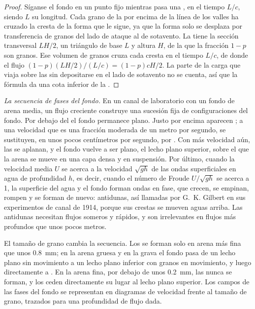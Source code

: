\begin{proof}
Síganse el fondo en un punto fijo mientras pasa una , en el tiempo $L/c$, siendo $L$ su longitud. Cada grano de la  por encima de la línea de los valles
ha cruzado la cresta de la forma que le sigue, ya que la forma solo se desplaza por transferencia de granos del lado de ataque al de sotavento. La  tiene la sección transversal
$LH/2$, un triángulo de base $L$ y altura $H$, de la que la fracción $1 - p$ son granos. Ese volumen de granos cruza cada cresta en el tiempo $L/c$, de donde el flujo
$(1-p)(LH/2)/(L/c) = (1-p)cH/2$. La parte de la carga que viaja sobre las  sin depositarse en el lado de sotavento no se cuenta, así que la fórmula da una cota inferior
de la .
\end{proof}

\emph{La secuencia de fases del fondo.} En un canal de laboratorio con un fondo de arena media, un flujo creciente construye una sucesión fija de configuraciones del fondo.
Por debajo del  el fondo permanece plano. Justo por encima aparecen ; a una velocidad que es una fracción moderada de un metro por segundo,
se sustituyen, en unos pocos centímetros por segundo, por . Con más velocidad aún, las  se aplanan, y el fondo vuelve a ser plano, el lecho plano superior,
sobre el que la arena se mueve en una capa densa y en suspensión. Por último, cuando la velocidad media $U$ se acerca a la velocidad $\sqrt{gh}$ de las ondas
superficiales en agua de profundidad $h$, es decir, cuando el número de Froude $U/\sqrt{gh}$ se acerca a 1, la superficie del agua y el fondo forman ondas en fase,
que crecen, se empinan, rompen y se forman de nuevo: antidunas, así llamadas por G.~K. Gilbert en sus experimentos de canal de 1914, porque sus crestas se mueven
aguas arriba. Las antidunas necesitan flujos someros y rápidos, y son irrelevantes en flujos más profundos que unos pocos metros.

El tamaño de grano cambia la secuencia. Los  se forman solo en arena más fina que unos \qty{0.8}{mm}; en la arena gruesa y en la grava el fondo pasa de un
lecho plano sin movimiento a un lecho plano inferior con granos en movimiento, y luego directamente a . En la arena fina, por debajo de unos \qty{0.2}{mm}, las 
nunca se forman, y los  ceden directamente su lugar al lecho plano superior. Los campos de las fases del fondo se representan en diagramas de velocidad frente al
tamaño de grano, trazados para una profundidad de flujo dada.

